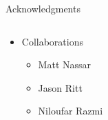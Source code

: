 \documentclass[bigger]{beamer}
\begin{document}
{\begin{frame}{Acknowledgments}
\begin{columns}[T]
        \begin{column}{0.5\textwidth}
            \begin{itemize}
                \small
                \item Collaborations
                \begin{itemize}
                    \tiny
                    \item Matt Nassar
                    \item Jason Ritt
                    \item Niloufar Razmi
                \end{itemize}
            \end{itemize}
        \end{column}
    \end{columns}
\end{frame}
}
\end{document}

